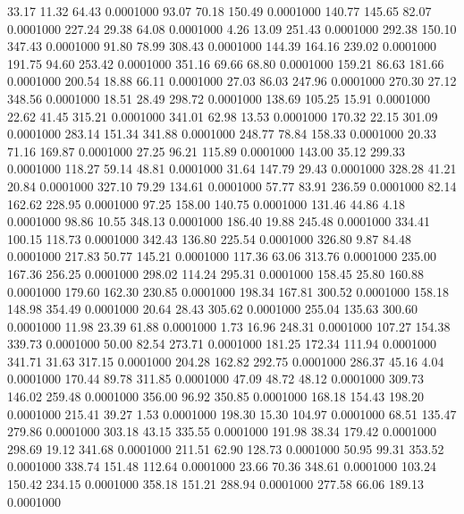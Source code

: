   33.17   11.32   64.43   0.0001000
  93.07   70.18  150.49   0.0001000
 140.77  145.65   82.07   0.0001000
 227.24   29.38   64.08   0.0001000
   4.26   13.09  251.43   0.0001000
 292.38  150.10  347.43   0.0001000
  91.80   78.99  308.43   0.0001000
 144.39  164.16  239.02   0.0001000
 191.75   94.60  253.42   0.0001000
 351.16   69.66   68.80   0.0001000
 159.21   86.63  181.66   0.0001000
 200.54   18.88   66.11   0.0001000
  27.03   86.03  247.96   0.0001000
 270.30   27.12  348.56   0.0001000
  18.51   28.49  298.72   0.0001000
 138.69  105.25   15.91   0.0001000
  22.62   41.45  315.21   0.0001000
 341.01   62.98   13.53   0.0001000
 170.32   22.15  301.09   0.0001000
 283.14  151.34  341.88   0.0001000
 248.77   78.84  158.33   0.0001000
  20.33   71.16  169.87   0.0001000
  27.25   96.21  115.89   0.0001000
 143.00   35.12  299.33   0.0001000
 118.27   59.14   48.81   0.0001000
  31.64  147.79   29.43   0.0001000
 328.28   41.21   20.84   0.0001000
 327.10   79.29  134.61   0.0001000
  57.77   83.91  236.59   0.0001000
  82.14  162.62  228.95   0.0001000
  97.25  158.00  140.75   0.0001000
 131.46   44.86    4.18   0.0001000
  98.86   10.55  348.13   0.0001000
 186.40   19.88  245.48   0.0001000
 334.41  100.15  118.73   0.0001000
 342.43  136.80  225.54   0.0001000
 326.80    9.87   84.48   0.0001000
 217.83   50.77  145.21   0.0001000
 117.36   63.06  313.76   0.0001000
 235.00  167.36  256.25   0.0001000
 298.02  114.24  295.31   0.0001000
 158.45   25.80  160.88   0.0001000
 179.60  162.30  230.85   0.0001000
 198.34  167.81  300.52   0.0001000
 158.18  148.98  354.49   0.0001000
  20.64   28.43  305.62   0.0001000
 255.04  135.63  300.60   0.0001000
  11.98   23.39   61.88   0.0001000
   1.73   16.96  248.31   0.0001000
 107.27  154.38  339.73   0.0001000
  50.00   82.54  273.71   0.0001000
 181.25  172.34  111.94   0.0001000
 341.71   31.63  317.15   0.0001000
 204.28  162.82  292.75   0.0001000
 286.37   45.16    4.04   0.0001000
 170.44   89.78  311.85   0.0001000
  47.09   48.72   48.12   0.0001000
 309.73  146.02  259.48   0.0001000
 356.00   96.92  350.85   0.0001000
 168.18  154.43  198.20   0.0001000
 215.41   39.27    1.53   0.0001000
 198.30   15.30  104.97   0.0001000
  68.51  135.47  279.86   0.0001000
 303.18   43.15  335.55   0.0001000
 191.98   38.34  179.42   0.0001000
 298.69   19.12  341.68   0.0001000
 211.51   62.90  128.73   0.0001000
  50.95   99.31  353.52   0.0001000
 338.74  151.48  112.64   0.0001000
  23.66   70.36  348.61   0.0001000
 103.24  150.42  234.15   0.0001000
 358.18  151.21  288.94   0.0001000
 277.58   66.06  189.13   0.0001000
